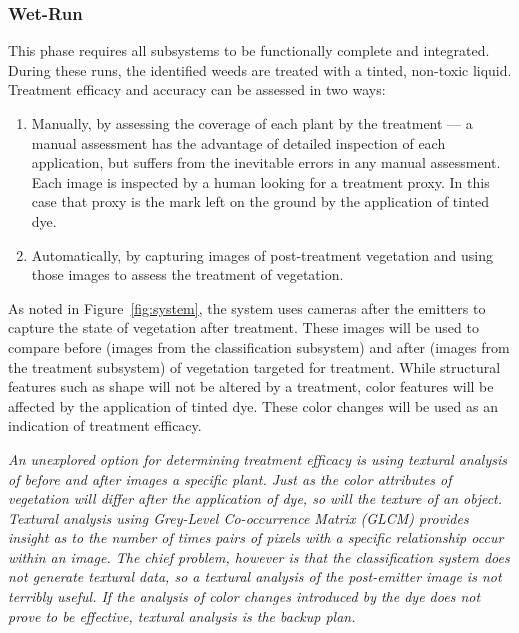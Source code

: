 \documentclass[12pt]{article}
\begin{document}
\subsubsection{Wet-Run} 
This phase requires all subsystems to be functionally complete and integrated. During these runs, the identified weeds are treated with a tinted, non-toxic liquid.  Treatment efficacy and accuracy can be assessed in two ways:
\begin{enumerate}
	\item{Manually, by assessing the coverage of each plant by the treatment --- a manual assessment has the advantage of detailed inspection of each application, but suffers from the inevitable errors in any manual assessment. Each image is inspected by a human looking for a treatment proxy. In this case that proxy is the mark left on the ground by the application of tinted dye.}
	\item{Automatically, by capturing images of post-treatment vegetation and using those images to assess the treatment of vegetation.}
\end{enumerate}
As noted in Figure~\ref{fig:system}, the system uses cameras after the emitters to capture the state of vegetation after treatment. These images will be used to compare before (images from the classification subsystem) and after (images from the treatment subsystem) of vegetation targeted for treatment. While structural features such as shape will not be altered by a treatment, color features will be affected by the application of tinted dye. These color changes will be used as an indication of treatment efficacy.

\textit{
An unexplored option for determining treatment efficacy is using textural analysis of before and after images a specific plant. Just as the color attributes of vegetation will differ after the application of dye, so will the texture of an object. Textural analysis using Grey-Level Co-occurrence Matrix (GLCM) provides insight as to the number of times pairs of pixels with a specific relationship occur within an image. The chief problem, however is that the classification system does not generate textural data, so a textural analysis of the post-emitter image is not terribly useful. If the analysis of color changes introduced by the dye does not prove to be effective, textural analysis is the backup plan.
}
\end{document}
